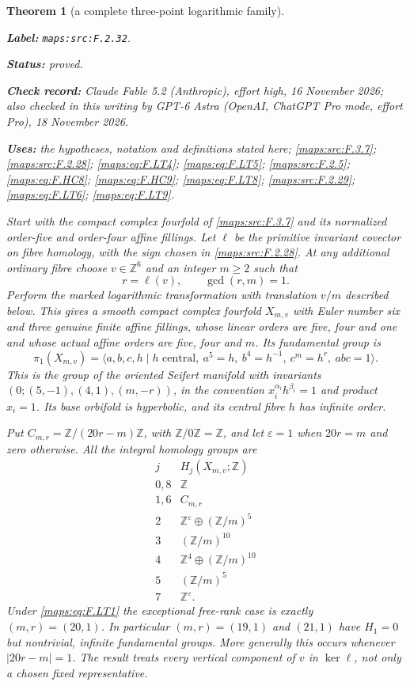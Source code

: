 \documentclass[11pt,a4paper]{article}
\newtheorem{theorem}{Theorem}[section]
\theoremstyle{definition}
\newcommand{\StatementRecord}[4]{\par\smallskip\begingroup\upshape\raggedright\noindent\textbf{Label:} \nolinkurl{#1}.\par\noindent\textbf{Status:} #2.\par\noindent\textbf{Check record:} #3.\par\noindent\textbf{Uses:} #4.\par\endgroup\smallskip}
\newcommand{\CurrentChecker}{GPT-6 Astra (OpenAI, ChatGPT Pro mode, effort Pro), 18 November 2026}
\begin{document}
\begin{theorem}[a complete three-point logarithmic family]\label{maps:src:F.2.32}
\StatementRecord{maps:src:F.2.32}{proved}{Claude Fable 5.2 (Anthropic), effort high, 16 November 2026; also checked in this writing by \CurrentChecker}{the hypotheses, notation and definitions stated here; \cref{maps:src:F.3.7}; \cref{maps:src:F.2.28}; \cref{maps:eq:F.LT4}; \cref{maps:eq:F.LT5}; \cref{maps:src:F.2.5}; \cref{maps:eq:F.HC8}; \cref{maps:eq:F.HC9}; \cref{maps:eq:F.LT8}; \cref{maps:src:F.2.29}; \cref{maps:eq:F.LT6}; \cref{maps:eq:F.LT9}}


Start with the compact complex fourfold of \ref{maps:src:F.3.7} and its
normalized order-five and order-four affine fillings.
Let $\ell$ be the primitive invariant covector on fibre
homology, with the sign chosen in \ref{maps:src:F.2.28}.
At any additional ordinary fibre choose
$v\in\mathbb Z^6$ and an integer $m\ge2$ such that
\[
 r=\ell(v),\qquad \gcd(r,m)=1.
\tag{F.LT1}\label{maps:eq:F.LT1}
\]
Perform the marked logarithmic transformation with
translation $v/m$ described below.
This gives a smooth compact complex fourfold $X_{m,v}$
with Euler number six and three genuine finite affine
fillings, whose linear orders are five, four and one
and whose actual affine orders are five, four and $m$.
Its fundamental group is
\[
 \pi_1(X_{m,v})=
 \langle a,b,c,h\mid h\text{ central},\
   a^5=h,\ b^4=h^{-1},\ c^m=h^r,\ abc=1\rangle .
\tag{F.LT2}\label{maps:eq:F.LT2}
\]
This is the group of the oriented Seifert manifold
with invariants
$(0;(5,-1),(4,1),(m,-r))$, in the convention
$x_i^{\alpha_i}h^{\beta_i}=1$ and product $x_i=1$.
Its base orbifold is hyperbolic, and its central fibre
$h$ has infinite order.

Put $C_{m,r}=\mathbb Z/(20r-m)\mathbb Z$, with
$\mathbb Z/0\mathbb Z=\mathbb Z$, and let
$\varepsilon=1$ when $20r=m$ and zero otherwise.
All the integral homology groups are
\[
\begin{array}{c|c}
j&H_j(X_{m,v};\mathbb Z)\\ \hline
0,8&\mathbb Z\\
1,6&C_{m,r}\\
2&\mathbb Z^\varepsilon\oplus(\mathbb Z/m)^5\\
3&(\mathbb Z/m)^{10}\\
4&\mathbb Z^4\oplus(\mathbb Z/m)^{10}\\
5&(\mathbb Z/m)^5\\
7&\mathbb Z^\varepsilon .
\end{array}
\tag{F.LT3}\label{maps:eq:F.LT3}
\]
Under \eqref{maps:eq:F.LT1} the exceptional free-rank case is exactly
$(m,r)=(20,1)$.
In particular $(m,r)=(19,1)$ and $(21,1)$ have
$H_1=0$ but nontrivial, infinite fundamental groups.
More generally this occurs whenever $|20r-m|=1$.
The result treats every vertical component of $v$
in $\ker\ell$, not only a chosen fixed representative.

\end{theorem}
\end{document}
